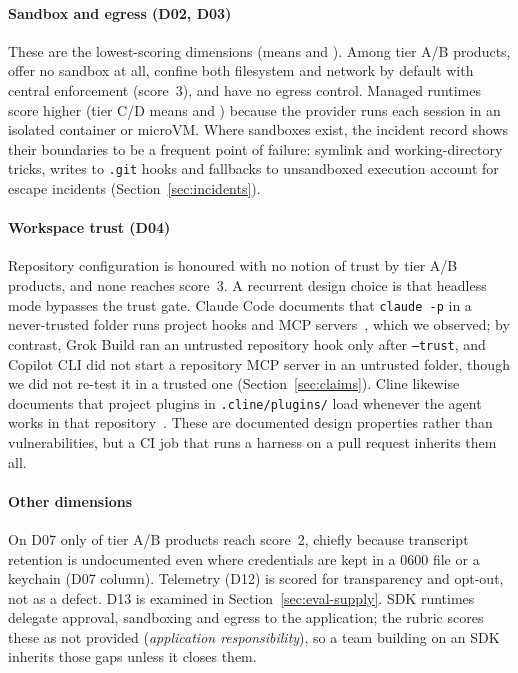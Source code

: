 \paragraph*{Sandbox and egress (D02, D03)} These are the lowest-scoring dimensions (means \dimABMeanTwo{} and \dimABMeanThree{}). Among tier A/B products, \dimABZeroTwo{} offer no sandbox at all, \dimABThreeTwo{} confine both filesystem and network by default with central enforcement (score~3), and \dimABZeroThree{} have no egress control. Managed runtimes score higher (tier C/D means \dimCMeanTwo{} and \dimCMeanThree{}) because the provider runs each session in an isolated container or microVM. Where sandboxes exist, the incident record shows their boundaries to be a frequent point of failure: symlink and working-directory tricks, writes to \texttt{.git} hooks and fallbacks to unsandboxed execution account for \nIncTSeventeen{} escape incidents (Section~\ref{sec:incidents}).

\paragraph*{Workspace trust (D04)} Repository configuration is honoured with no notion of trust by \dimABZeroFour{} tier A/B products, and none reaches score~3. A recurrent design choice is that headless mode bypasses the trust gate. Claude Code documents that \texttt{claude -p} in a never-trusted folder runs project hooks and MCP servers\evD~\cite{cc_permissions_trust}, which we observed\evT{}; by contrast, Grok Build ran an untrusted repository hook only after \texttt{--trust}\evD\evT{}, and Copilot CLI did not start a repository MCP server in an untrusted folder\evT{}, though we did not re-test it in a trusted one (Section~\ref{sec:claims}). Cline likewise documents that project plugins in \texttt{.cline/plugins/} load whenever the agent works in that repository\evD~\cite{cline_plugins}. These are documented design properties rather than vulnerabilities, but a CI job that runs a harness on a pull request inherits them all.

\paragraph*{Other dimensions} On D07 only \dimABTwoPlusSeven{} of \nRankedAB{} tier A/B products reach score~2, chiefly because transcript retention is undocumented even where credentials are kept in a 0600 file or a keychain\evD{} (D07 column). Telemetry (D12) is scored for transparency and opt-out, not as a defect. D13 is examined in Section~\ref{sec:eval-supply}. SDK runtimes delegate approval, sandboxing and egress to the application; the rubric scores these as not provided (\emph{application responsibility}), so a team building on an SDK inherits those gaps unless it closes them.
